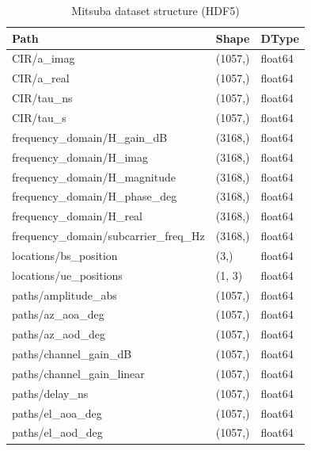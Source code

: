 \begin{table}
\caption{Mitsuba dataset structure (HDF5)}
\label{tab:mitsuba_dataset}
\begin{tabular}{lll}
\toprule
Path & Shape & DType \\
\midrule
CIR/a\_imag & (1057,) & float64 \\
CIR/a\_real & (1057,) & float64 \\
CIR/tau\_ns & (1057,) & float64 \\
CIR/tau\_s & (1057,) & float64 \\
frequency\_domain/H\_gain\_dB & (3168,) & float64 \\
frequency\_domain/H\_imag & (3168,) & float64 \\
frequency\_domain/H\_magnitude & (3168,) & float64 \\
frequency\_domain/H\_phase\_deg & (3168,) & float64 \\
frequency\_domain/H\_real & (3168,) & float64 \\
frequency\_domain/subcarrier\_freq\_Hz & (3168,) & float64 \\
locations/bs\_position & (3,) & float64 \\
locations/ue\_positions & (1, 3) & float64 \\
paths/amplitude\_abs & (1057,) & float64 \\
paths/az\_aoa\_deg & (1057,) & float64 \\
paths/az\_aod\_deg & (1057,) & float64 \\
paths/channel\_gain\_dB & (1057,) & float64 \\
paths/channel\_gain\_linear & (1057,) & float64 \\
paths/delay\_ns & (1057,) & float64 \\
paths/el\_aoa\_deg & (1057,) & float64 \\
paths/el\_aod\_deg & (1057,) & float64 \\
\bottomrule
\end{tabular}
\end{table}
